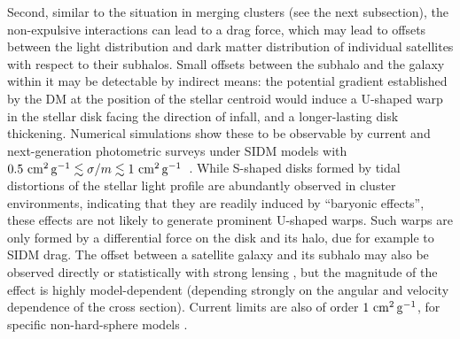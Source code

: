 





Second, similar to the situation in merging clusters (see the next subsection), the non-expulsive interactions can lead to a drag force, which may lead to offsets between the light distribution and dark matter distribution of individual satellites with respect to their subhalos. Small offsets between the subhalo and the galaxy within it may be detectable by indirect means: the potential gradient established by the DM at the position of the stellar centroid would induce a U-shaped warp in the stellar disk facing the direction of infall, and a longer-lasting disk thickening. Numerical simulations show these to be observable by current and next-generation photometric surveys under SIDM models with $0.5 \mathrm{\,\mathrm{\,cm}^2\mathrm{\,g}^{-1}} \lesssim \sigma/m \lesssim 1 \mathrm{\,\mathrm{\,cm}^2\mathrm{\,g}^{-1}}$~\citep{Secco}. While S-shaped disks formed by tidal distortions of the stellar light profile are abundantly observed in cluster environments, indicating that they are readily induced by ``baryonic effects'', these effects are not likely to generate prominent U-shaped warps. Such warps are only formed by a differential force on the disk and its halo, due for example to SIDM drag.  The offset between a satellite galaxy and its subhalo may also be observed directly or statistically with strong lensing \citep{Massey2011,Massey:2017cwf}, but the magnitude of the effect is highly model-dependent (depending strongly on the angular  and velocity dependence of the cross section).  Current limits are also of order $1\mathrm{\,\mathrm{\,cm}^2\mathrm{\,g}^{-1}}$, for specific non-hard-sphere models \citep{Harvey:2015hha}.  



\vspace{1em} 
\label{sec:merging_clusters}

